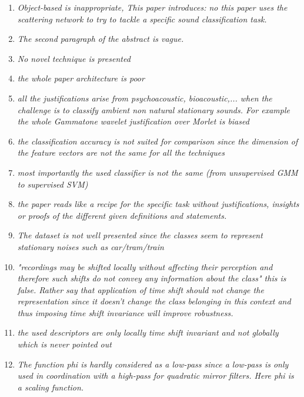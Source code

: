 \documentclass[10pt]{article}
\begin{document}
\begin{enumerate}

\item \emph{Object-based is inappropriate, This paper introduces: no this paper uses the scattering network to try to tackle a specific sound classification task.}

\item \emph{The second paragraph of the abstract is vague.}

\item \emph{No novel technique is presented}

\item \emph{the whole paper architecture is poor}

\item \emph{all the justifications arise from psychoacoustic, bioacoustic,... when the challenge is to classify ambient non natural stationary sounds. For example the whole Gammatone wavelet justification over Morlet is biased}

\item \emph{the classification accuracy is not suited for comparison since the dimension of the feature vectors are not the same for all the techniques }

\item \emph{most importantly the used classifier is not the same (from unsupervised GMM to supervised SVM)}

\item \emph{the paper reads like a recipe for the specific task without justifications, insights or proofs of the different given definitions and statements.}

\item \emph{The dataset is not well presented since the classes seem to represent stationary noises such as car/tram/train}

\item \emph{"recordings may be shifted locally 
without affecting their perception and therefore such shifts do not convey any information about the class" this is false. Rather say that application of time shift should not change the representation since it doesn't change the class belonging in this context and thus imposing time shift invariance will improve robustness.}

\item \emph{the used descriptors are only locally time shift invariant and not globally which is never pointed out}

\item \emph{The function phi is hardly considered as a low-pass since a low-pass is only used in coordination with a high-pass for quadratic mirror filters. Here phi is a scaling function.}


\end{enumerate}
\end{document}
